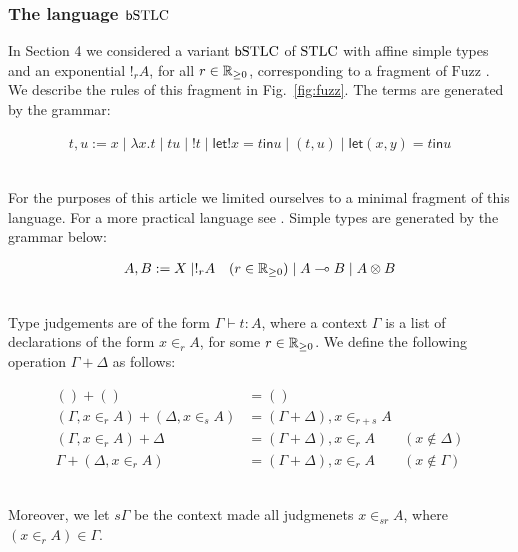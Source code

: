 
\subsubsection{The language $\mathsf b\mathrm{STLC}$}
In Section 4 we considered a variant $\mathsf b\mathrm{STLC}$ of $\mathrm{STLC}$ with affine simple types and an exponential $!_{r}A$, for all $r\in \mathbb{R}_{\geq 0}$, corresponding to a fragment of $\mathrm{Fuzz}$ \cite{Reed_2010}. 
We describe the rules of this fragment in Fig.~\ref{fig:fuzz}.
The terms are generated by the grammar:

{
\begin{minipage}{\textwidth}
\begin{align*}
t,u:= x\mid \lambda x.t\mid tu \mid !t \mid \mathsf{let} !x=t\mathsf{in} u\mid (t,u)\mid  \mathsf{let} (x,y)=t\mathsf{in} u 
\end{align*}\end{minipage}}\medskip\\
For the purposes of this article we limited ourselves to a minimal fragment of this language. For a more practical language see \cite{Reed_2010,Gaboardi2017}.  
Simple types are generated by the grammar below:

{
\begin{minipage}{\textwidth}
\begin{align*}
A,B:= X\mid !_{r}A \quad (r\in \mathbb{R}_{\geq 0}) \mid A\multimap B \mid A\otimes B
\end{align*}\end{minipage}}\medskip\\
Type judgements are of the form $\Gamma \vdash t:A$, where a context $\Gamma$ is a list of declarations of the form $x\in_{r}A$, for some $r\in \mathbb{R}_{\geq 0}$.
We define the following operation $\Gamma+\Delta$  as follows:

{
\begin{minipage}{\textwidth}
\begin{align*}
() + () & =() \\
(\Gamma, x\in_{r} A)+( \Delta, x\in_{s} A) & =  (\Gamma+\Delta), x\in_{r+s}A \\
(\Gamma, x\in_{r}A)+\Delta & =(\Gamma+\Delta), x\in_{r}A \qquad (x\notin \Delta) \\
\Gamma+ (\Delta, x\in_{r}A) &= (\Gamma+\Delta), x\in_{r} A \qquad (x\notin \Gamma)
\end{align*}\end{minipage}}\medskip\\
Moreover, we let $s\Gamma$ be the context made all judgmenets $x\in_{sr}A$, where $(x\in_{r}A)\in \Gamma$.  

